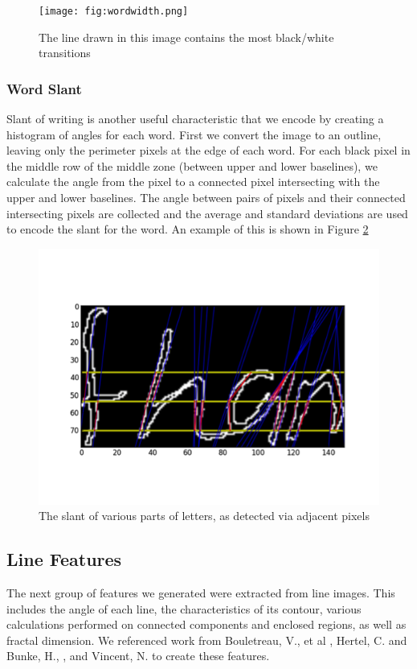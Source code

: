 \documentclass[paper=a4, fontsize=11pt]{scrartcl} %
\numberwithin{equation}{section} %
\numberwithin{figure}{section} %
\numberwithin{table}{section} %
\begin{document}
\begin{figure}
  \texttt{[image: fig:wordwidth.png]}
  \caption{The line drawn in this image contains the most black/white
    transitions}
  \label{fig:wordwidth}
\end{figure}

\subsubsection{Word Slant}
Slant of writing is another useful characteristic that we encode by
creating a histogram of angles for each word. First we convert the
image to an outline, leaving only the perimeter pixels at the edge of
each word. For each black pixel in the middle row of the middle zone
(between upper and lower baselines), we calculate the angle from the
pixel to a connected pixel intersecting with the upper and lower
baselines. The angle between pairs of pixels and their connected
intersecting pixels are collected and the average and standard
deviations are used to encode the slant for the word. An example of
this is shown in Figure \ref{fig:wordslant}

\begin{figure}
  \includegraphics{wordslant.png}
  \caption{The slant of various parts of letters, as detected via
    adjacent pixels}
  \label{fig:wordslant}
\end{figure}


\subsection{Line Features}
The next group of features we generated were extracted from line
images. This includes the angle of each line, the characteristics of
its contour, various calculations performed on connected components
and enclosed regions, as well as fractal dimension. We referenced work
from Bouletreau, V., et al \cite{SyntheticParameters}, Hertel, C. and
Bunke, H., \cite{NovelFeatures}, and Vincent,
N. \cite{FractalDimensions} to create these features.
\end{document}
